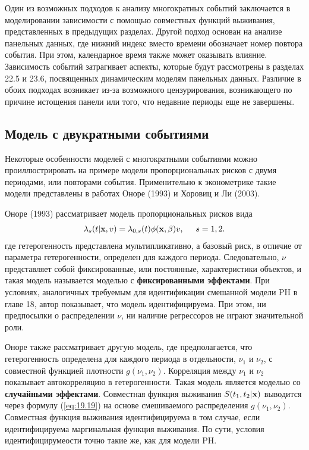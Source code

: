 Один из возможных подходов к анализу многократных событий заключается в моделировании зависимости с помощью совместных функций выживания, представленных в предыдущих разделах. Другой подход основан на анализе панельных данных, где нижний индекс вместо времени обозначает номер повтора события. При этом, календарное время также может оказывать влияние. Зависимость событий затрагивает аспекты, которые будут рассмотрены в разделах 22.5 %
и 23.6, %
посвященных динамическим моделям панельных данных. Различие в обоих подходах возникает из-за возможного цензурирования, возникающего по причине истощения панели или того, что недавние периоды еще не завершены.




\subsection{Модель с двукратными событиями}\label{sec:19.4.1}

\noindent
Некоторые особенности моделей с многократными событиями можно проиллюстрировать на примере модели пропорциональных рисков с двумя периодами, или повторами события. Применительно к эконометрике такие модели представлены в работах Оноре (1993) и Хоровиц и Ли (2003).

Оноре (1993) рассматривает модель пропорциональных рисков вида
        \begin{align}\label{eq:19.24}
        \lambda_s(t|\mathbf{x},v) = \lambda_{0,s}(t) \phi(\mathbf{x},\beta)v, \hspace{0.5cm} s=1,2.
        \end{align}
где гетерогенность представлена мультипликативно, а базовый риск, в отличие от параметра гетерогенности, определен для каждого периода. Следовательно, $\nu$ представляет собой фиксированные, или постоянные, характеристики объектов, и такая модель называется моделью с \textbf{фиксированными эффектами}. При условиях, аналогичных требуемым для идентификации смешанной модели PH в главе 18, автор показывает, что модель идентифицируема. При этом, ни предпосылки о распределении $\nu$, ни наличие регрессоров не играют значительной роли.

Оноре также рассматривает другую модель, где предполагается, что гетерогенность определена для каждого периода в отдельности, $\nu_1$ и $\nu_2$, с совместной функцией плотности $g(\nu_1, \nu_2)$. Корреляция между $\nu_1$ и $\nu_2$ показывает автокорреляцию в гетерогенности. Такая модель является моделью со \textbf{случайными эффектами}. Совместная функция выживания $S(t_1, t_2|\mathbf{x})$ выводится через формулу  (\ref{eq:19.19}) на основе смешиваемого распределения $g(\nu_1, \nu_2)$. Совместная функция выживания идентифицируема в том случае, если идентифицируема маргинальная функция выживания. По сути, условия идентифицирумеости точно такие же, как для модели PH.

